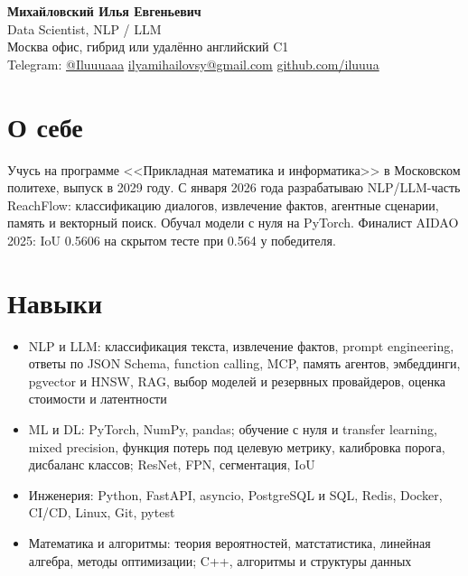 \documentclass[10pt,a4paper]{article}
\begin{document}
\begin{center}
  {\LARGE\bfseries Михайловский Илья Евгеньевич}\\[2pt]
  {\large Data Scientist, NLP / LLM}\\[3pt]
  Москва \textperiodcentered{} офис, гибрид или удалённо \textperiodcentered{} английский C1\\[2pt]
  Telegram: \href{https://t.me/Iluuuaaa}{@Iluuuaaa} \textperiodcentered{}
  \href{mailto:ilyamihailovsy@gmail.com}{ilyamihailovsy@gmail.com} \textperiodcentered{}
  \href{https://github.com/iluuua}{github.com/iluuua}
\end{center}

\section{О себе}
Учусь на программе <<Прикладная математика и информатика>> в Московском политехе, выпуск в 2029 году.
С января 2026 года разрабатываю NLP/LLM-часть ReachFlow: классификацию диалогов, извлечение фактов,
агентные сценарии, память и векторный поиск. Обучал модели с нуля на PyTorch.
Финалист AIDAO 2025: IoU 0.5606 на скрытом тесте при 0.564 у победителя.

\section{Навыки}
\begin{itemize}
  \item NLP и LLM: классификация текста, извлечение фактов, prompt engineering,
        ответы по JSON Schema, function calling, MCP, память агентов, эмбеддинги,
        pgvector и HNSW, RAG, выбор моделей и резервных провайдеров, оценка стоимости и латентности
  \item ML и DL: PyTorch, NumPy, pandas; обучение с нуля и transfer learning, mixed precision,
        функция потерь под целевую метрику, калибровка порога, дисбаланс классов;
        ResNet, FPN, сегментация, IoU
  \item Инженерия: Python, FastAPI, asyncio, PostgreSQL и SQL, Redis, Docker, CI/CD,
        Linux, Git, pytest
  \item Математика и алгоритмы: теория вероятностей, матстатистика, линейная алгебра,
        методы оптимизации; C++, алгоритмы и структуры данных
\end{itemize}
\end{document}
